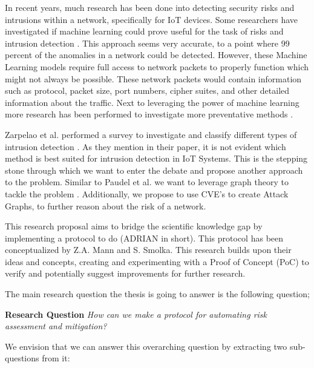 In recent years, much research has been done into detecting security risks and intrusions within a network, specifically for IoT devices. Some researchers have investigated if machine learning could prove useful for the task of risks and intrusion detection \cite{canedo2016using, doshi2018machine, hamza2019detecting, sivanathan2018classifying}. This approach seems very accurate, to a point where 99 percent of the anomalies in a network could be detected. However, these Machine Learning models require full access to network packets to properly function which might not always be possible. These network packets would contain information such as protocol, packet size, port numbers, cipher suites, and other detailed information about the traffic. Next to leveraging the power of machine learning more research has been performed to investigate more preventative methods \cite{miettinen2017iot, hamza2019detecting, paudel2019detecting}.

Zarpelao et al. performed a survey to investigate and classify different types of intrusion detection \cite{zarpelao2017survey}. As they mention in their paper, it is not evident which method is best suited for intrusion detection in IoT Systems. This is the stepping stone through which we want to enter the debate and propose another approach to the problem. Similar to Paudel et al. we want to leverage graph theory to tackle the problem \cite{paudel2019detecting}. Additionally, we propose to use CVE's to create Attack Graphs, to further reason about the risk of a network.

This research proposal aims to bridge the scientific knowledge gap by implementing a protocol to do \ADRIAN (ADRIAN in short). This protocol has been conceptualized by Z.A. Mann and S. Smolka.
 This research builds upon their ideas and concepts, creating and experimenting with a Proof of Concept (PoC) to verify and potentially suggest improvements for further research. 


\vspace{1em}
The main research question the thesis is going to answer is the following question;

\textbf{Research Question}\label{rq} \emph{How can we make a protocol for automating risk assessment and mitigation?}\vspace{1em}

We envision that we can answer this overarching question by extracting two sub-questions from it:

